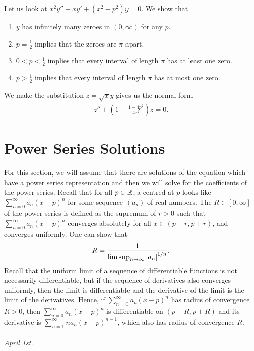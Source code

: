 \begin{example}
    Let us look at  $x^{2}y'' + xy' + (x^{2}-p^{2})y = 0$. We show that
    \begin{enumerate}
        \item $y$ has infinitely many zeroes in $(0,\infty)$ for any $p$.
        \item $p = \frac{1}{2}$ implies that the zeroes are $\pi$-apart.
        \item $0 < p < \frac{1}{2}$ implies that every interval of length $\pi$ has at least one zero.
        \item $p > \frac{1}{2}$ implies that every interval of length $\pi$ has at most one zero.
    \end{enumerate}
    We make the substitution $z = \sqrt{x} y$ gives us the normal form
    \begin{align}
        z'' + \left( 1 + \frac{1-4p^{2}}{4x^{2}} \right) z = 0.
    \end{align}
\end{example}

\section{Power Series Solutions}
For this section, we will assume that there are solutions of the equation which have a power series representation and then we will solve for the coefficients of the power series. Recall that for all $p \in \mathbb{R}$, a  centred at $p$ looks like $\sum_{n=0}^{\infty} a_{n} (x-p)^{n}$ for some sequence $(a_{n})$ of real numbers. The  $R \in [0,\infty]$ of the power series is defined as the supremum of $r > 0$ such that $\sum_{n=0}^{\infty} a_{n} (x-p)^{n}$ converges absolutely for all $x \in (p-r,p+r)$, and converges uniformly. One can show that
\begin{align}
    R = \frac{1}{\limsup_{n \to \infty} \left| a_{n} \right|^{1/n}}.
\end{align}
Recall that the uniform limit of a sequence of differentiable functions is not necessarily differentiable, but if the sequence of derivatives also converges uniformly, then the limit is differentiable and the derivative of the limit is the limit of the derivatives. Hence, if $\sum_{n=0}^{\infty} a_{n} (x-p)^{n}$ has radius of convergence $R > 0$, then $\sum_{n=0}^{\infty} a_{n} (x-p)^{n}$ is differentiable on $(p-R,p+R)$ and its derivative is $\sum_{n=1}^{\infty} n a_{n} (x-p)^{n-1}$, which also has radius of convergence $R$.
\\ \\
\noindent \textit{April 1st.}

